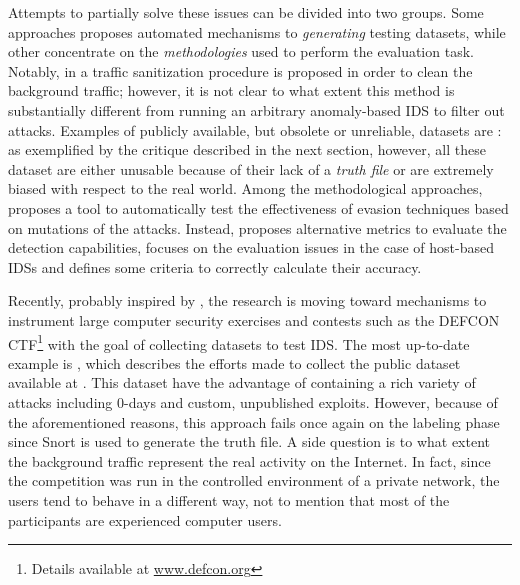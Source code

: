 Attempts to partially solve these issues can be divided into two
groups. Some approaches proposes automated mechanisms to
\emph{generating} testing datasets, while other concentrate on the
\emph{methodologies} used to perform the evaluation task. Notably, in
\citep{cretu:sp2008:sanitization} a traffic sanitization procedure is
proposed in order to clean the background traffic; however, it is not
clear to what extent this method is substantially different from
running an arbitrary anomaly-based \ac{IDS} to filter out
attacks. Examples of publicly available, but obsolete or unreliable,
datasets are
\citep{ideval_1998_results,ideval_1999_doc,shmoosite,exploittree,kddcup}:
as exemplified by the critique described in the next section, however,
all these dataset are either unusable because of their lack of a
\emph{truth file} or are extremely biased with respect to the real
world. Among the methodological approaches,
\citep{vigna:ccs2004:sploit} proposes a tool to automatically test the
effectiveness of evasion techniques based on mutations of the
attacks. Instead, \citep{lee:2001:measures} proposes alternative
metrics to evaluate the detection capabilities,
\citep{dblp:conf/raid/sharifsgl07} focuses on the evaluation issues in
the case of host-based \acp{IDS} and defines some criteria
to correctly calculate their accuracy.

Recently, probably inspired by \citep{shmoosite}, the research is
moving toward mechanisms to instrument large computer security
exercises \citep{Augustine_cyberdefense} and contests such as the
DEFCON \ac{CTF}\footnote{Details available at
\url{www.defcon.org}} with the goal of collecting datasets to test
\ac{IDS}. The most up-to-date example is \citep{cdx2009}, which
describes the efforts made to collect the public dataset available at
\citep{cdx2009_site}. This dataset have the advantage of containing a
rich variety of attacks including 0-days and custom, unpublished
exploits. However, because of the aforementioned reasons, this
approach fails once again on the labeling phase since \textsf{Snort}
is used to generate the truth file. A side question is to what extent
the background traffic represent the real activity on the Internet. In
fact, since the competition was run in the controlled environment of a
private network, the users tend to behave in a different way, not to
mention that most of the participants are experienced computer users.

